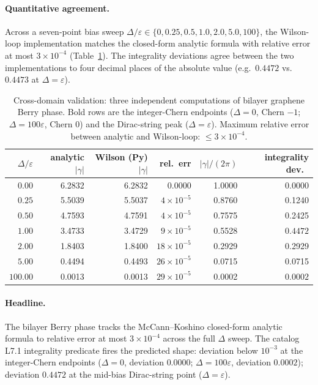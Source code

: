 \documentclass[11pt,letterpaper]{article}
\begin{document}
\paragraph{Quantitative agreement.}
Across a seven-point bias sweep $\Delta/\varepsilon \in \{0, 0.25,
0.5, 1.0, 2.0, 5.0, 100\}$, the Wilson-loop implementation matches
the closed-form analytic formula with relative error at most
$3 \times 10^{-4}$ (Table~\ref{tab:dpu-validation}). The
integrality deviations agree between the two implementations to
four decimal places of the absolute value (e.g.\ $0.4472$ vs.\
$0.4473$ at $\Delta = \varepsilon$).

\begin{table}[h]
\centering
\small
\begin{tabular}{rrrrrr}
\toprule
$\Delta/\varepsilon$ & analytic $|\gamma|$ & Wilson (Py) $|\gamma|$
& rel.\ err & $|\gamma|/(2\pi)$ & integrality dev.\ \\
\midrule
$0.00$    & 6.2832 & 6.2832 & 0.0000 & 1.0000 & $\mathbf{0.0000}$ \\
$0.25$    & 5.5039 & 5.5037 & $4 \times 10^{-5}$  & 0.8760 & 0.1240 \\
$0.50$    & 4.7593 & 4.7591 & $4 \times 10^{-5}$  & 0.7575 & 0.2425 \\
$1.00$    & 3.4733 & 3.4729 & $9 \times 10^{-5}$  & 0.5528 & $\mathbf{0.4472}$ \\
$2.00$    & 1.8403 & 1.8400 & $18 \times 10^{-5}$ & 0.2929 & 0.2929 \\
$5.00$    & 0.4494 & 0.4493 & $26 \times 10^{-5}$ & 0.0715 & 0.0715 \\
$100.00$  & 0.0013 & 0.0013 & $29 \times 10^{-5}$ & 0.0002 & $\mathbf{0.0002}$ \\
\bottomrule
\end{tabular}
\caption{Cross-domain validation: three independent computations of
bilayer graphene Berry phase. Bold rows are the integer-Chern
endpoints ($\Delta = 0$, Chern $-1$; $\Delta = 100\varepsilon$,
Chern $0$) and the Dirac-string peak ($\Delta = \varepsilon$).
Maximum relative error between analytic and Wilson-loop:
$\leq 3 \times 10^{-4}$.}
\label{tab:dpu-validation}
\end{table}

\paragraph{Headline.}
The bilayer Berry phase tracks the McCann--Koshino closed-form
analytic formula to relative error at most $3 \times 10^{-4}$ across
the full $\Delta$ sweep. The catalog L7.1 integrality predicate
fires the predicted shape: deviation below $10^{-3}$ at the
integer-Chern endpoints ($\Delta = 0$, deviation $0.0000$; $\Delta =
100\varepsilon$, deviation $0.0002$); deviation
$\mathbf{0.4472}$ at the mid-bias Dirac-string point
($\Delta = \varepsilon$).
\end{document}
